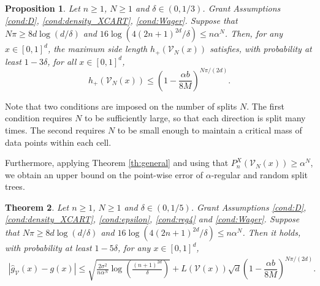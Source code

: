 \documentclass[paper=a4, fontsize=11pt]{scrartcl}
\newcommand{\PP}{\mathbb{P}}
\newtheorem{theorem}{Theorem}
\newtheorem{proposition}[theorem]{Proposition}
\begin{document}
\begin{proposition}\label{propWager}
Let $n \geq 1$, $N\geq 1$ and $\delta \in (0,1/3) $. Grant Assumptions \ref{cond:D}, \ref{cond:density_XCART}, \ref{cond:Wager}. Suppose that $N \pi \geq 8d \log(d/\delta)$ and $16 \log ( 4 (2n+1)^{2d} / \delta) \leq n \alpha^{N}$. Then, for any $x\in [0,1]^d$, the maximum side length $h_+(\mathcal{V}_N(x))$ satisfies, with probability at least $1-3\delta$, for all $x \in [0,1]^d$,
$$h_+(\mathcal{V}_N(x))  \leq \left(1-\dfrac{\alpha b}{8M}\right)^{{N\pi}/{(2d)}}.$$
\end{proposition}

Note that 
two conditions are imposed on the number of splits $N$. The first condition requires $N$ to be sufficiently large, so that each direction is split many times. The second requires $N$ to be small enough to maintain a critical mass of data points within each cell. 

Furthermore, %
 applying Theorem \ref{th:general} and using that $P_n^X(\mathcal{V}_N(x))\geq \alpha^N$, we obtain an upper bound on the point-wise error of $\alpha$-regular and random split trees.

\begin{theorem}\label{Wager}
Let $n \geq 1$, $N\geq 1$ and $\delta \in (0,1/5) $. Grant Assumptions \ref{cond:D}, \ref{cond:density_XCART}, \ref{cond:epsilon}, \ref{cond:reg4} and \ref{cond:Wager}. Suppose that $N \pi \geq 8d \log(d/\delta)$ and $16 \log ( 4 (2n+1)^{2d} / \delta) \leq n \alpha^{N}$. Then it holds,  with probability at least $1 - 5 \delta $, for any $x\in [0,1]^d$,
        \begin{align*}
       |  \hat g_{\mathcal V}(x) - g(x)| \leq \sqrt{\frac{ 2 \sigma^2 }{ n \alpha^N  } \log\left( \frac{ (n+1) ^{2d}}{\delta} \right)} + L(\mathcal V(x)  ) \sqrt{d} {\left(1-\dfrac{\alpha b}{8M}\right)^{N\pi/(2d)}}.
    \end{align*}
\end{theorem}
\end{document}

